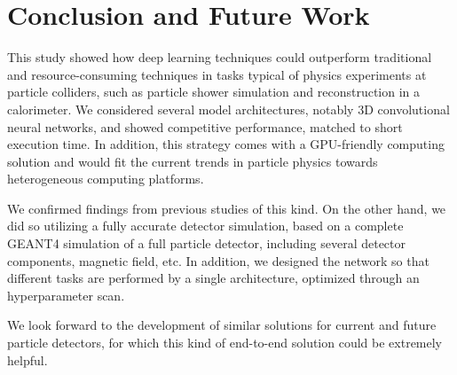 \chapter{Conclusion and Future Work}\label{sec:conclusion}

This study showed how deep learning techniques could outperform traditional and resource-consuming techniques in  tasks typical of physics experiments at particle colliders, such as particle shower simulation and reconstruction in a calorimeter. We considered several model architectures, notably 3D convolutional neural networks, and showed competitive performance, matched to short execution time. In addition, this strategy comes with a GPU-friendly computing solution and would fit the current trends in particle physics towards heterogeneous computing platforms.

We confirmed findings from previous studies of this kind. On the other hand, we did so utilizing a fully accurate detector simulation, based on a complete GEANT4 simulation of a full particle detector, including several detector components, magnetic field, etc. In addition, we designed the network so that different tasks are performed by a single architecture, optimized through an hyperparameter scan.

We look forward to the development of similar solutions for current and future particle detectors, for which this kind of end-to-end solution could be extremely helpful.